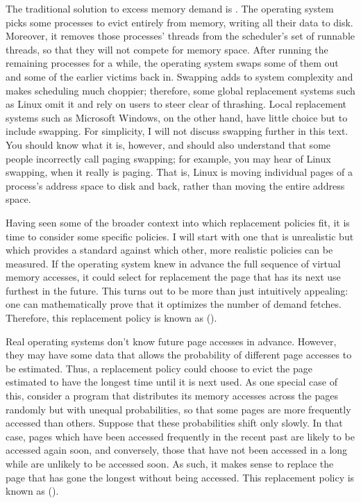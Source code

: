 The traditional solution to excess memory demand is .
The operating system picks some processes to evict entirely from
memory, writing all their data to disk.  Moreover, it removes those
processes' threads from the scheduler's set of runnable threads, so
that they will not compete for memory space.  After running the
remaining processes for a while, the operating system swaps some of
them out and some of the earlier victims back in.  Swapping adds to
system complexity and makes scheduling much choppier; therefore,
some global replacement systems such as Linux omit it and rely on
users to steer clear of thrashing.  Local replacement systems such as
Microsoft Windows, on the other hand, have little choice but to
include swapping.  For simplicity, I will not discuss swapping
further in this text.  You should know what it is, however, and should
also understand that some people incorrectly call paging swapping; for
example, you may hear of Linux swapping, when it really is paging.
That is, Linux is moving individual pages of a process's address space
to disk and back, rather than moving the entire address space.

Having seen some of the broader context into which replacement
policies fit, it is time to consider some specific policies.
I will start with one that is unrealistic but which provides a
standard against which other, more realistic policies can be measured.
If the operating system knew in advance the full sequence of virtual
memory accesses, it could select for replacement the page that has its
next use furthest in the future.  This turns out to be more than just
intuitively appealing: one can mathematically prove that it optimizes
the number of demand fetches.  Therefore, this replacement policy is
known as  ().

Real operating systems don't know future page accesses in advance.
However, they may have some data that allows the probability of
different page accesses to be estimated.  Thus, a replacement policy
could choose to evict the page estimated to have the longest time
until it is next used.  As one special case of this, consider a
program that distributes its memory accesses across the pages
randomly but with unequal probabilities, so that some pages are more
frequently accessed than others.  Suppose that these probabilities
shift only slowly. In that case, pages which have been accessed
frequently in the recent past are likely to be accessed again soon,
and conversely, those that have not been accessed in a long while are
unlikely to be accessed soon.  As such, it makes sense to replace the
page that has gone the longest without being accessed.  This
replacement policy is known as  ().

